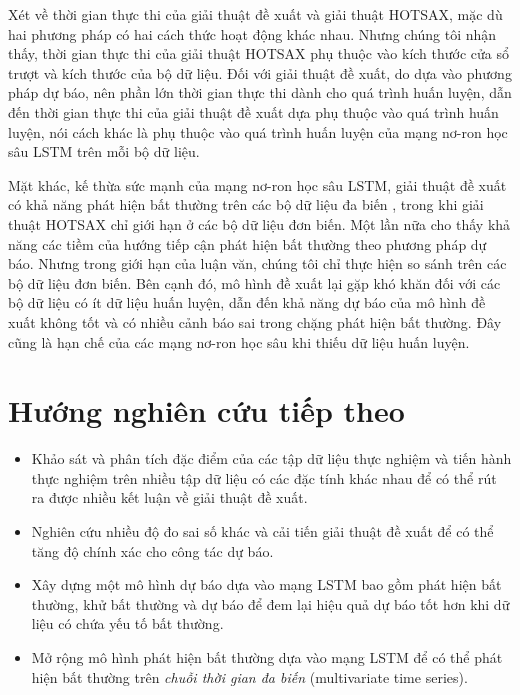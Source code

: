 Xét về thời gian thực thi của giải thuật đề xuất và giải thuật HOTSAX, mặc dù hai phương pháp có hai cách thức hoạt động khác nhau. Nhưng chúng tôi nhận thấy, thời gian thực thi của giải thuật HOTSAX phụ thuộc vào kích thước cửa sổ trượt và kích thước của bộ dữ liệu. Đối với giải thuật đề xuất, do dựa vào phương pháp dự báo, nên phần lớn thời gian thực thi dành cho quá trình huấn luyện, dẫn đến thời gian thực thi của giải thuật đề xuất dựa phụ thuộc vào quá trình huấn luyện, nói cách khác là phụ thuộc vào quá trình huấn luyện của mạng nơ-ron học sâu LSTM trên mỗi bộ dữ liệu.

Mặt khác, kế thừa sức mạnh của mạng nơ-ron học sâu LSTM, giải thuật đề xuất có khả năng phát hiện bất thường trên các bộ dữ liệu đa biến \cite{st32}, trong khi giải thuật HOTSAX chỉ giới hạn ở các bộ dữ liệu đơn biến. Một lần nữa cho thấy khả năng các tiềm của hướng tiếp cận phát hiện bất thường theo phương pháp dự báo. Nhưng trong giới hạn của luận văn, chúng tôi chỉ thực hiện so sánh trên các bộ dữ liệu đơn biến.
Bên cạnh đó, mô hình đề xuất lại gặp khó khăn đối với các bộ dữ liệu có ít dữ liệu huấn luyện, dẫn đến khả năng dự báo của mô hình đề xuất không tốt và có nhiều cảnh báo sai trong chặng phát hiện bất thường. Đây cũng là hạn chế của các mạng nơ-ron học sâu khi thiếu dữ liệu huấn luyện.

\section{Hướng nghiên cứu tiếp theo}
\begin{itemize}
\item Khảo sát và phân tích đặc điểm của các tập dữ liệu thực nghiệm và tiến hành thực nghiệm trên nhiều tập dữ liệu có các đặc tính khác nhau để có thể rút ra được nhiều kết luận về giải thuật đề xuất.
\item Nghiên cứu nhiều độ đo sai số khác và cải tiến giải thuật đề xuất để có thể tăng độ chính xác cho công tác dự báo.
\item Xây dựng một mô hình dự báo dựa vào mạng LSTM bao gồm phát hiện bất thường, khử bất thường và dự báo để đem lại hiệu quả dự báo tốt hơn khi dữ liệu có chứa yếu tố bất thường.
\item Mở rộng mô hình phát hiện bất thường dựa vào mạng LSTM để có thể phát hiện bất thường trên \textit{chuỗi thời gian đa biến} (multivariate time series).
\end{itemize}